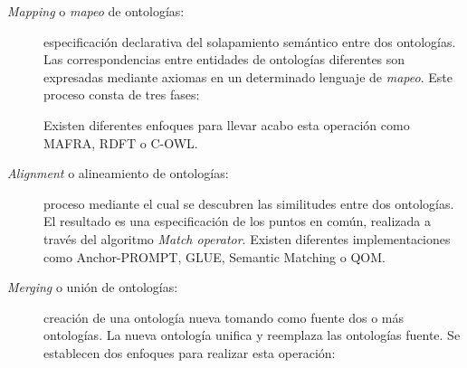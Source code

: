 \begin{description}
\item[\textit{Mapping} o \textit{mapeo} de ontologías:] especificación declarativa del
solapamiento semántico entre dos ontologías. Las correspondencias entre
entidades de ontologías diferentes son expresadas mediante axiomas en un
determinado lenguaje de \textit{mapeo}. Este proceso consta de tres fases:
 Existen diferentes enfoques para llevar acabo esta operación
como MAFRA, RDFT o C-OWL.
\item[\textit{Alignment} o alineamiento de ontologías:] proceso mediante el cual
se descubren las similitudes entre dos ontologías. El resultado es una especificación de los puntos en común, realizada a través del algoritmo 
\textit{Match operator}. Existen diferentes implementaciones como
Anchor-PROMPT, GLUE, Semantic Matching o QOM.
\item[\textit{Merging} o unión de ontologías:] creación de una ontología nueva
tomando como fuente dos o más ontologías. La nueva ontología unifica y reemplaza
las ontologías fuente. Se establecen dos enfoques para realizar esta
operación: 
\end{description}

